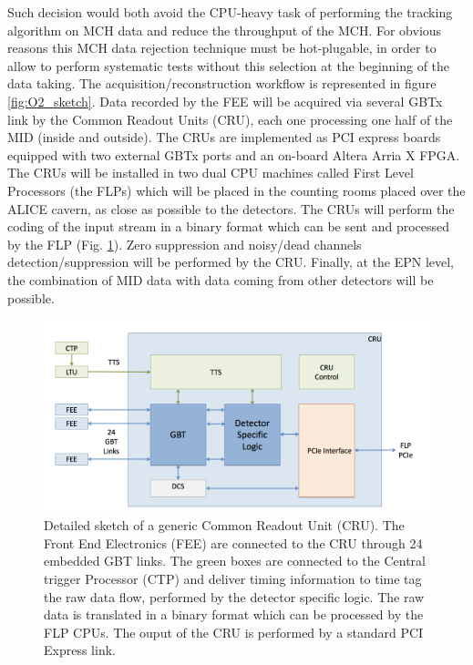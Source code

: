 Such decision would both avoid the CPU-heavy task of performing the tracking algorithm on MCH data and reduce the throughput of the MCH.
For obvious reasons this MCH data rejection technique must be hot-plugable, in order to allow to perform systematic tests without this selection at the beginning of the data taking.
The acquisition/reconstruction workflow is represented in figure \ref{fig:O2_sketch}.
Data recorded by the FEE will be acquired via several GBTx link by the Common Readout Units (CRU), each one processing one half of the MID (inside and outside).
The CRUs are implemented as PCI express boards equipped with two external GBTx ports and an on-board Altera Arria X FPGA.
The CRUs will be installed in two dual CPU machines called First Level Processors (the FLPs) which will be placed in the counting rooms placed over the ALICE cavern, as close as possible to the detectors.
The CRUs will perform the coding of the input stream in a binary format which can be sent and processed by the FLP (Fig. \ref{fig:O2_CRU}).
Zero suppression and noisy/dead channels detection/suppression will be performed by the CRU.
Finally, at the EPN level, the combination of MID data with data coming from other detectors will be possible.

\begin{figure}[!ht]
\begin{center}
\includegraphics[width=0.9\linewidth]{Chapters/O2/Figs/CRU.pdf}
\caption{Detailed sketch of a generic Common Readout Unit (CRU). The Front End Electronics (FEE) are connected to the CRU through 24 embedded GBT links. The green boxes are connected to the Central trigger Processor (CTP) and deliver timing information to time tag the raw data flow, performed by the detector specific logic. The raw data is translated in a binary format which can be processed by the FLP CPUs. The ouput of the CRU is performed by a standard PCI Express link.}
\label{fig:O2_CRU}
\end{center}
\end{figure}

